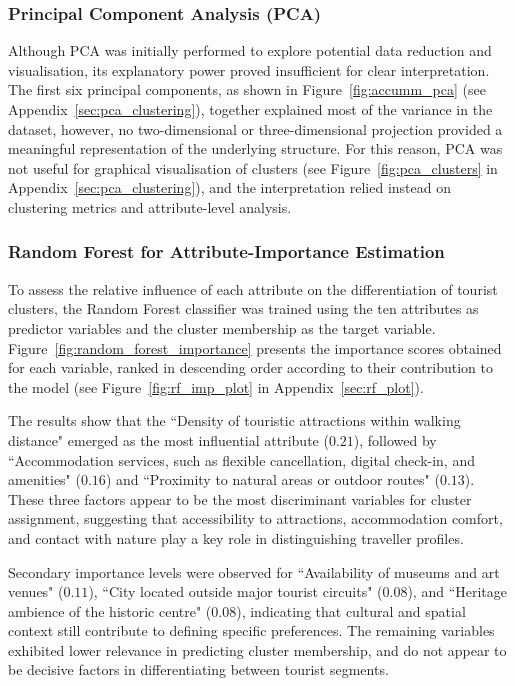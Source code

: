 \documentclass[a4paper, 12pt, twoside]{report}  %
\begin{document}
\subsubsection{Principal Component Analysis (PCA)}

\indent Although PCA was initially performed to explore potential data reduction and visualisation, its explanatory power proved insufficient for clear interpretation. The first six principal components, as shown in Figure~\ref{fig:accumm_pca} (see Appendix~\ref{sec:pca_clustering}), together explained most of the variance in the dataset, however, no two-dimensional or three-dimensional projection provided a meaningful representation of the underlying structure. For this reason, PCA was not useful for graphical visualisation of clusters (see Figure~\ref{fig:pca_clusters} in Appendix~\ref{sec:pca_clustering}), and the interpretation relied instead on clustering metrics and attribute-level analysis.

\subsubsection{Random Forest for Attribute-Importance Estimation}

\indent To assess the relative influence of each attribute on the differentiation of tourist clusters, the Random Forest classifier was trained using the ten attributes as predictor variables and the cluster membership as the target variable. Figure~\ref{fig:random_forest_importance} presents the importance scores obtained for each variable, ranked in descending order according to their contribution to the model (see Figure~\ref{fig:rf_imp_plot} in Appendix~\ref{sec:rf_plot}).

\indent The results show that the ``Density of touristic attractions within walking distance" emerged as the most influential attribute ($0.21$), followed by ``Accommodation services, such as flexible cancellation, digital check-in, and amenities" ($0.16$) and ``Proximity to natural areas or outdoor routes" ($0.13$). These three factors appear to be the most discriminant variables for cluster assignment, suggesting that accessibility to attractions, accommodation comfort, and contact with nature play a key role in distinguishing traveller profiles.

\indent Secondary importance levels were observed for ``Availability of museums and art venues" ($0.11$), ``City located outside major tourist circuits" ($0.08$), and ``Heritage ambience of the historic centre" ($0.08$), indicating that cultural and spatial context still contribute to defining specific preferences. The remaining variables exhibited lower relevance in predicting cluster membership, and do not appear to be decisive factors in differentiating between tourist segments.
\end{document}
